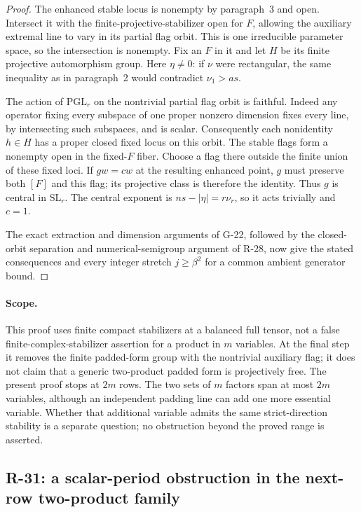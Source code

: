 \begin{proof}
The enhanced stable locus is nonempty by paragraph~3 and open.
Intersect it with the finite-projective-stabilizer open for $F$,
allowing the auxiliary extremal line to vary in its partial
flag orbit. This is one irreducible parameter space, so the
intersection is nonempty. Fix an $F$ in it and let $H$ be its
finite projective automorphism group. Here $\eta\ne0$: if
$\nu$ were rectangular, the same inequality as in paragraph~2
would contradict $\nu_1>as$.

The action of $\mathrm{PGL}_r$ on the nontrivial partial flag
orbit is faithful. Indeed any operator fixing every subspace
of one proper nonzero dimension fixes every line, by intersecting
such subspaces, and is scalar. Consequently each nonidentity
$h\in H$ has a proper closed fixed locus on this orbit. The
stable flags form a nonempty open in the fixed-$F$ fiber.
Choose a flag there outside the finite union of these fixed
loci. If $g w=cw$ at the resulting enhanced point, $g$ must
preserve both $[F]$ and this flag; its projective class is
therefore the identity. Thus $g$ is central in $\mathrm{SL}_r$.
The central exponent is $ns-|\eta|=r\nu_r$, so it acts
trivially and $c=1$.

The exact extraction and dimension arguments of G-22, followed
by the closed-orbit separation and numerical-semigroup argument
of R-28, now give the stated consequences and every integer
stretch $j\geq\beta^2$ for a common ambient generator bound.
\end{proof}

\paragraph{Scope.}
This proof uses finite compact stabilizers at a balanced full
tensor, not a false finite-complex-stabilizer assertion for a
product in $m$ variables. At the final step it removes the
finite padded-form group with the nontrivial auxiliary flag;
it does not claim that a generic two-product padded form is
projectively free. The present proof stops at $2m$ rows. The two sets of $m$
factors span at most $2m$ variables, although an independent
padding line can add one more essential variable. Whether
that additional variable admits the same strict-direction
stability is a separate question; no obstruction beyond the
proved range is asserted.


\subsection{R-31: a scalar-period obstruction in the next-row two-product family}

